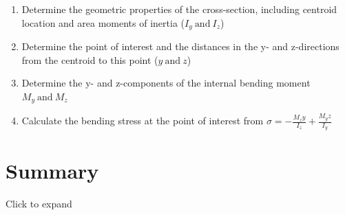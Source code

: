 \documentclass[
  letterpaper,
  DIV=11,
  numbers=noendperiod]{scrreprt}
\theoremstyle{definition}
\theoremstyle{remark}
\begin{document}
\begin{tcolorbox}[enhanced jigsaw, leftrule=.75mm, colbacktitle=quarto-callout-warning-color!10!white, breakable, opacityback=0, colback=white, titlerule=0mm, toprule=.15mm, colframe=quarto-callout-warning-color-frame, coltitle=black, title=\textcolor{quarto-callout-warning-color}{\faExclamationTriangle}\hspace{0.5em}{Step-by-step: Unsymmetric Bending}, toptitle=1mm, bottomrule=.15mm, rightrule=.15mm, left=2mm, arc=.35mm, opacitybacktitle=0.6, bottomtitle=1mm]

\begin{enumerate}
\def\labelenumi{\arabic{enumi}.}
\item
  Determine the geometric properties of the cross-section, including
  centroid location and area moments of inertia (\(I_y~\text{and}~I_z\))
\item
  Determine the point of interest and the distances in the y- and
  z-directions from the centroid to this point (\(y~\text{and}~z\))
\item
  Determine the y- and z-components of the internal bending moment
  \(M_y~\text{and}~M_z\)
\item
  Calculate the bending stress at the point of interest from
  \(\sigma=-\frac{M_z y}{I_z}+\frac{M_y z}{I_y}\)
\end{enumerate}

\end{tcolorbox}

\section*{Summary}\label{summary-8}


Click to expand
\end{document}
